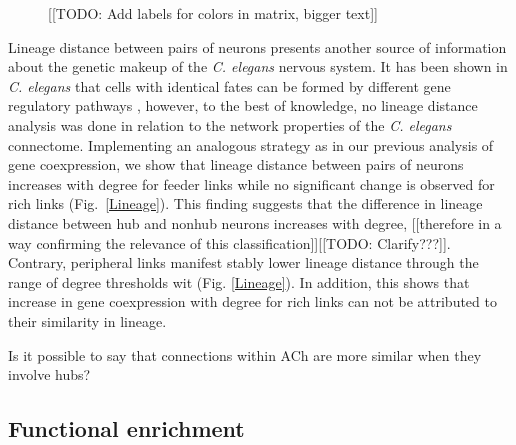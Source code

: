 \documentclass[10pt,letterpaper]{article}
\begin{document}
\begin{figure}[!h]
{%
[[TODO: Add labels for colors in matrix, bigger text]]
}
 \label{fig:modules}
\end{figure}


Lineage distance between pairs of neurons presents another source of information about the genetic makeup of the \textit{C. elegans} nervous system.
It has been shown in \textit{C. elegans} that cells with identical fates can be formed by different gene regulatory pathways \cite{Liu2009}, however, to the best of knowledge, no lineage distance analysis was done in relation to the network properties of the \textit{C. elegans} connectome.
Implementing an analogous strategy as in our previous analysis of gene coexpression, we show that lineage distance between pairs of neurons increases with degree for feeder links while no significant change is observed for rich links (Fig.~\ref{Lineage}).
This finding suggests that the difference in lineage distance between hub and nonhub neurons increases with degree, [[therefore in a way confirming the relevance of this classification]][[TODO: Clarify???]].
Contrary, peripheral links manifest stably lower lineage distance through the range of degree thresholds wit (Fig. \ref{Lineage}).
In addition, this shows that increase in gene coexpression with degree for rich links can not be attributed to their similarity in lineage.

Is it possible to say that connections within ACh are more similar when they involve hubs?

\subsection*{Functional enrichment}
\end{document}
